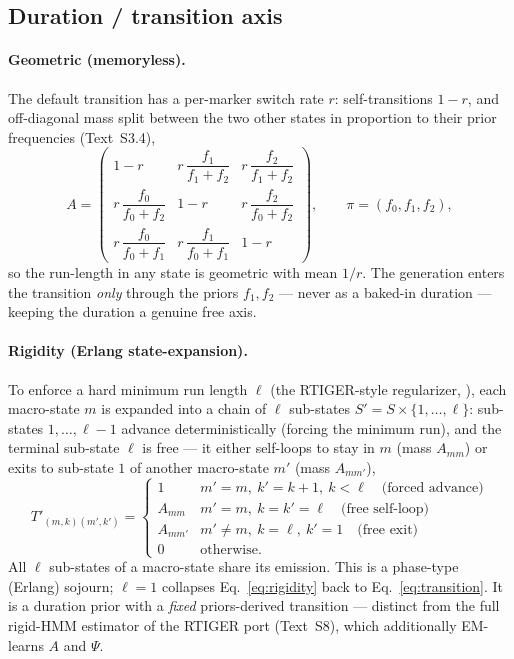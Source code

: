 \documentclass[11pt]{article}
\begin{document}
\subsection{Duration / transition axis}
\label{sec:engine-duration}

\paragraph{Geometric (memoryless).} The default transition has a per-marker switch
rate $r$: self-transitions $1-r$, and off-diagonal mass split between the two other
states in proportion to their prior frequencies (Text~S3.4),
\begin{equation}
A=\begin{pmatrix}
1-r & r\,\dfrac{f_1}{f_1+f_2} & r\,\dfrac{f_2}{f_1+f_2}\\[8pt]
r\,\dfrac{f_0}{f_0+f_2} & 1-r & r\,\dfrac{f_2}{f_0+f_2}\\[8pt]
r\,\dfrac{f_0}{f_0+f_1} & r\,\dfrac{f_1}{f_0+f_1} & 1-r
\end{pmatrix},
\qquad
\pi=(f_0,f_1,f_2),
\label{eq:transition}
\end{equation}
so the run-length in any state is geometric with mean $1/r$. The generation enters
the transition \emph{only} through the priors $f_1,f_2$ --- never as a baked-in
duration --- keeping the duration a genuine free axis.

\paragraph{Rigidity (Erlang state-expansion).} To enforce a hard minimum run length
$\ell$ (the RTIGER-style regularizer, \citealp{rtiger_2023,tiger_2015}), each
macro-state $m$ is expanded into a chain of
$\ell$ sub-states $S'=S\times\{1,\dots,\ell\}$: sub-states $1,\dots,\ell-1$ advance
deterministically (forcing the minimum run), and the terminal sub-state $\ell$ is free
--- it either self-loops to stay in $m$ (mass $A_{mm}$) or exits to sub-state $1$ of
another macro-state $m'$ (mass $A_{mm'}$),
\begin{equation}
T'_{(m,k)(m',k')}=
\begin{cases}
1 & m'=m,\ k'=k+1,\ k<\ell \quad\text{(forced advance)}\\
A_{mm} & m'=m,\ k=k'=\ell \quad\text{(free self-loop)}\\
A_{mm'} & m'\ne m,\ k=\ell,\ k'=1 \quad\text{(free exit)}\\
0 & \text{otherwise.}
\end{cases}
\label{eq:rigidity}
\end{equation}
All $\ell$ sub-states of a macro-state share its emission. This is a phase-type
(Erlang) sojourn; $\ell=1$ collapses Eq.~\eqref{eq:rigidity} back to
Eq.~\eqref{eq:transition}. It is a duration prior with a \emph{fixed}
priors-derived transition --- distinct from the full rigid-HMM estimator of the
RTIGER port (Text~S8), which additionally EM-learns $A$ and $\Psi$.
\end{document}
